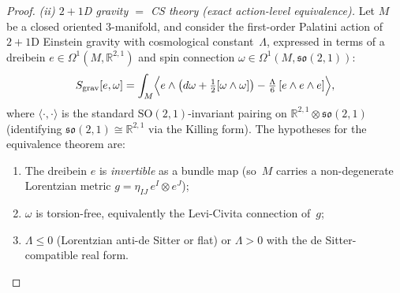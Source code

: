 \begin{proof}
\emph{(ii) $2{+}1$D gravity $=$ CS theory
(exact action-level equivalence).}
Let $M$ be a closed oriented $3$-manifold, and consider
the first-order Palatini action of $2{+}1$D Einstein
gravity with cosmological constant~$\Lambda$, expressed
in terms of a dreibein $e \in \Omega^1(M,\mathbb{R}^{2,1})$
and spin connection $\omega \in \Omega^1(M, \mathfrak{so}(2,1))$:
\begin{equation}\label{eq:palatini}
  S_{\mathrm{grav}}[e, \omega]
  = \int_M \Bigl\langle e\wedge\bigl(d\omega
    + \tfrac12[\omega\wedge\omega]\bigr)
    - \tfrac{\Lambda}{6}\,[e\wedge e\wedge e]\Bigr\rangle,
\end{equation}
where $\langle\cdot,\cdot\rangle$ is the standard
$\mathrm{SO}(2,1)$-invariant pairing on
$\mathbb{R}^{2,1}\otimes \mathfrak{so}(2,1)$
(identifying $\mathfrak{so}(2,1) \cong \mathbb{R}^{2,1}$
via the Killing form).  The hypotheses for the
equivalence theorem are:
\begin{enumerate}[label=(\alph*'),leftmargin=*,topsep=0pt,itemsep=0pt]
\item The dreibein $e$ is \emph{invertible} as a bundle
  map (so~$M$ carries a non-degenerate Lorentzian metric
  $g = \eta_{IJ}\, e^I \otimes e^J$);
\item $\omega$ is torsion-free, equivalently
  the Levi-Civita connection of~$g$;
\item $\Lambda \le 0$ (Lorentzian anti-de Sitter or flat)
  or $\Lambda > 0$ with the de Sitter-compatible real form.
\end{enumerate}


\end{proof}
